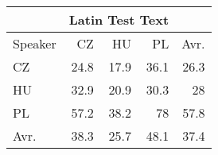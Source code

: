 \begin{tabular}{l|rrr|r}
\hline
 & \multicolumn{3}{c}{Latin Test Text} & \\
\hline
 Speaker   &   CZ &   HU &   PL &   Avr. \\
\hline
 CZ        & 24.8 & 17.9 & 36.1 &   26.3 \\
 HU        & 32.9 & 20.9 & 30.3 &   28   \\
 PL        & 57.2 & 38.2 & 78   &   57.8 \\
\hline
 Avr.     & 38.3 & 25.7 & 48.1 &   37.4 \\
\hline
\end{tabular}